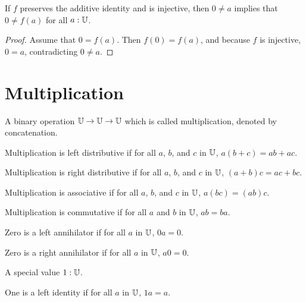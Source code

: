 \documentclass[../../math.tex]{subfiles}
\begin{document}
\begin{theorem} \label{homo_inj_zero}
    If $f$ preserves the additive identity and is injective, then $0 \neq a$
    implies that $0 \neq f(a)$ for all $a : \mathbb{U}$.
\end{theorem}
\begin{proof}
    Assume that $0 = f(a)$.  Then $f(0) = f(a)$, and because $f$ is injective,
    $0 = a$, contradicting $0 \neq a$.
\end{proof}

\section{Multiplication}

\begin{class} \label{mult}
    A binary operation $\mathbb{U} \rightarrow \mathbb{U} \rightarrow \mathbb{U}$ which is called
    multiplication, denoted by concatenation.
\end{class}

\begin{class}
    Multiplication is left distributive if for all $a$, $b$, and $c$ in $\mathbb{U}$,
    $a(b + c) = ab + ac$.
\end{class}

\begin{class}
    Multiplication is right distributive if for all $a$, $b$, and $c$ in $\mathbb{U}$,
    $(a + b)c = ac + bc$.
\end{class}

\begin{class}
    Multiplication is associative if for all $a$, $b$, and $c$ in $\mathbb{U}$, $a(bc) =
    (ab)c$.
\end{class}

\begin{class}
    Multiplication is commutative if for all $a$ and $b$ in $\mathbb{U}$, $ab = ba$.
\end{class}

\begin{class}
    Zero is a left annihilator if for all $a$ in $\mathbb{U}$, $0a = 0$.
\end{class}

\begin{class}
    Zero is a right annihilator if for all $a$ in $\mathbb{U}$, $a0 = 0$.
\end{class}

\begin{class}
    A special value $1 : \mathbb{U}$.
\end{class}

\begin{class}
    One is a left identity if for all $a$ in $\mathbb{U}$, $1a = a$.
\end{class}
\end{document}
